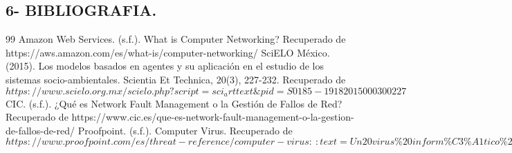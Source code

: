 \documentclass[12pt]{article}
\begin{document}
{\color{blue} \subsection*{6- BIBLIOGRAFIA.}}
\vspace{1em}

\begin{thebibliography}{99}
    Amazon Web Services. (s.f.). What is Computer Networking? Recuperado de https://aws.amazon.com/es/what-is/computer-networking/
    SciELO México. (2015). Los modelos basados en agentes y su aplicación en el estudio de los sistemas socio-ambientales. Scientia Et Technica, 20(3), 227-232. Recuperado de $https://www.scielo.org.mx/scielo.php?script=sci_arttext\&pid=S0185-19182015000300227$
    CIC. (s.f.). ¿Qué es Network Fault Management o la Gestión de Fallos de Red? Recuperado de https://www.cic.es/que-es-network-fault-management-o-la-gestion-de-fallos-de-red/
    Proofpoint. (s.f.). Computer Virus. Recuperado de $https://www.proofpoint.com/es/threat-reference/computer-virus:~:text=Un20virus\%20inform\%C3\%A1tico\%20es\%20una,un\%20dispositivo\%20o\%20red\%20local.$
\end{thebibliography}
\end{document}
